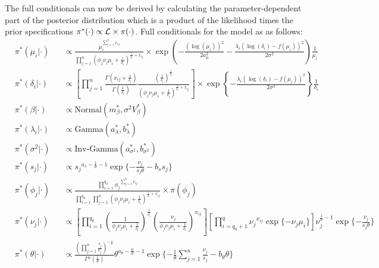 \newpage

The full conditionals can now be derived by calculating the parameter-dependent part of the posterior distribution which is a product of the likelihood times the prior specifications $\pi^\ast(\cdot)\propto{}\mathcal{L}\times\pi(\cdot)$. Full conditionals for the model as as follows: \\

\begingroup
\addtolength{\jot}{0.8em}
\begin{align*} \label{eq::FullCond}
&\pi^*(\mu_i|\cdot) && \propto \frac{\mu_i^{\sum_{j=1}^n{}x_{ij}}}{\prod_{j=1}^n{}(\phi_j\nu_j\mu_i+\frac{1}{\delta_i})^{\frac{1}{\delta_i}+x_{ij}}}\times{}\exp\left(-\frac{(\log(\mu_i))^2}{2a_\mu^2}-\frac{\lambda_i(\log(\delta_i)-f(\mu_i))^2}{2\sigma^2}\right)\frac{1}{\mu_i} \\
&\pi^*(\delta_i|\cdot) && \propto \left[\prod_{j=1}^n\frac{\Gamma(x_{ij}+\frac{1}{\delta_i})}{\Gamma(\frac{1}{\delta_i})}\frac{(\frac{1}{\delta_i})^{\frac{1}{\delta_i}}}{(\phi_j\nu_j\mu_i+\frac{1}{\delta_i})^{\frac{1}{\delta_i}+x_{ij}}}\right]\times{}\exp\left\lbrace-\frac{\lambda_i(\log(\delta_i)-f(\mu_i))^2}{2\sigma^2}\right\rbrace\frac{1}{\delta_i}\\
&\pi^*(\beta|\cdot)&&\propto{}\text{Normal}(m^*_\beta,\sigma^2V^*_\beta)\\
&\pi^*(\lambda_i|\cdot)&&\propto{}\text{Gamma}(a^*_\lambda,b^*_\lambda)\\
&\pi^*(\sigma^2|\cdot)&&\propto{}\text{Inv-Gamma}(a^*_{\sigma^2},b^*_{\sigma^2})\\
&\pi^*(s_j|\cdot)&&\propto{}s_j{}^{a_s-\frac{1}{\theta}-1}\exp\lbrace-\frac{\nu_j}{s_j\theta}-b_ss_j\rbrace\\
&\pi^*(\phi_j|\cdot)&&\propto{}\frac{\prod_{i=1}^{q_0}\phi_j{}^{\sum_{j=1}^nx_{ij}}}{\prod_{i=1}^{q_0}\prod_{j=1}^{n}(\phi_j\nu_j\mu_i+\frac{1}{\delta_i})^{\frac{1}{\delta_i}+x_{ij}}}\times{}\pi(\phi_j)\\
&\pi^*(\nu_j|\cdot)&&\propto{}\left[\prod_{i=1}^{q_0}\left(\frac{1}{\phi_j\nu_j\mu_i+\frac{1}{\delta_i}}\right)^\frac{1}{\delta_i}\left(\frac{\nu_j}{\phi_j\nu_j\mu_i+\frac{1}{\delta_i}}\right)^{x_{ij}}\right]\left[\prod_{i=q_0+1}^{q}\nu_j{}^{x_{ij}}\exp\lbrace-\nu_j\mu_i\rbrace\right]\nu_j^{\frac{1}{\theta}-1}\exp\lbrace-\frac{\nu_j}{s_j\theta}\rbrace\\
&\pi^*(\theta|\cdot)&&\propto{}\frac{\left(\prod_{j=1}^{n}\frac{s_j}{\nu_j}\right)^{-\frac{1}{\theta}}}{\Gamma{}^n(\frac{1}{\theta})}\theta^{a_\theta-\frac{n}{\theta}-1}\exp\lbrace-\frac{1}{\theta}\sum_{j=1}^n\frac{\nu_j}{s_j}-b_\theta\theta\rbrace
\end{align*}
\endgroup

